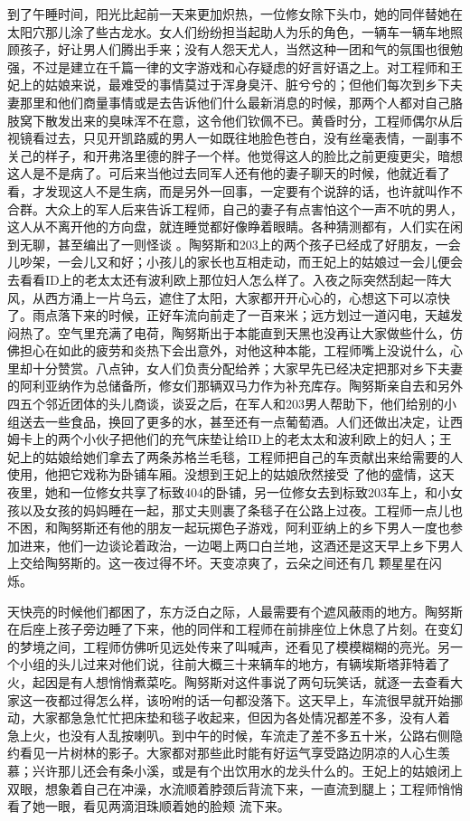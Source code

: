 \documentclass{article}
\begin{document}
\newpage

到了午睡时间，阳光比起前一天来更加炽热，一位修女除下头巾，她的同伴替她在太阳穴那儿涂了些古龙水。女人们纷纷担当起助人为乐的角色，一辆车一辆车地照顾孩子，好让男人们腾出手来；没有人怨天尤人，当然这种一团和气的氛围也很勉强，不过是建立在千篇一律的文字游戏和心存疑虑的好言好语之上。对工程师和王妃上的姑娘来说，最难受的事情莫过于浑身臭汗、脏兮兮的；但他们每次到乡下夫妻那里和他们商量事情或是去告诉他们什么最新消息的时候，那两个人都对自己胳肢窝下散发出来的臭味浑不在意，这令他们钦佩不已。黄昏时分，工程师偶尔从后视镜看过去，只见开凯路威的男人一如既往地脸色苍白，没有丝毫表情，一副事不关己的样子，和开弗洛里德的胖子一个样。他觉得这人的脸比之前更瘦更尖，暗想这人是不是病了。可后来当他过去同军人还有他的妻子聊天的时候，他就近看了看，才发现这人不是生病，而是另外一回事，一定要有个说辞的话，也许就叫作不合群。大众上的军人后来告诉工程师，自己的妻子有点害怕这个一声不吭的男人，这人从不离开他的方向盘，就连睡觉都好像睁着眼睛。各种猜测都有，人们实在闲到无聊，甚至编出了一则怪谈
\newpage
。陶努斯和203上的两个孩子已经成了好朋友，一会儿吵架，一会儿又和好；小孩儿的家长也互相走动，而王妃上的姑娘过一会儿便会去看看ID上的老太太还有波利欧上那位妇人怎么样了。入夜之际突然刮起一阵大风，从西方涌上一片乌云，遮住了太阳，大家都开开心心的，心想这下可以凉快了。雨点落下来的时候，正好车流向前走了一百来米；远方划过一道闪电，天越发闷热了。空气里充满了电荷，陶努斯出于本能直到天黑也没再让大家做些什么，仿佛担心在如此的疲劳和炎热下会出意外，对他这种本能，工程师嘴上没说什么，心里却十分赞赏。八点钟，女人们负责分配给养；大家早先已经决定把那对乡下夫妻的阿利亚纳作为总储备所，修女们那辆双马力作为补充库存。陶努斯亲自去和另外四五个邻近团体的头儿商谈，谈妥之后，在军人和203男人帮助下，他们给别的小组送去一些食品，换回了更多的水，甚至还有一点葡萄酒。人们还做出决定，让西姆卡上的两个小伙子把他们的充气床垫让给ID上的老太太和波利欧上的妇人；王妃上的姑娘给她们拿去了两条苏格兰毛毯，工程师把自己的车贡献出来给需要的人使用，他把它戏称为卧铺车厢。没想到王妃上的姑娘欣然接受
\newpage
了他的盛情，这天夜里，她和一位修女共享了标致404的卧铺，另一位修女去到标致203车上，和小女孩以及女孩的妈妈睡在一起，那丈夫则裹了条毯子在公路上过夜。工程师一点儿也不困，和陶努斯还有他的朋友一起玩掷色子游戏，阿利亚纳上的乡下男人一度也参加进来，他们一边谈论着政治，一边喝上两口白兰地，这酒还是这天早上乡下男人上交给陶努斯的。这一夜过得不坏。天变凉爽了，云朵之间还有几
颗星星在闪烁。 

天快亮的时候他们都困了，东方泛白之际，人最需要有个遮风蔽雨的地方。陶努斯在后座上孩子旁边睡了下来，他的同伴和工程师在前排座位上休息了片刻。在变幻的梦境之间，工程师仿佛听见远处传来了叫喊声，还看见了模模糊糊的亮光。另一个小组的头儿过来对他们说，往前大概三十来辆车的地方，有辆埃斯塔菲特着了火，起因是有人想悄悄煮菜吃。陶努斯对这件事说了两句玩笑话，就逐一去查看大家这一夜都过得怎么样，该吩咐的话一句都没落下。这天早上，车流很早就开始挪动，大家都急急忙忙把床垫和毯子收起来，但因为各处情况都差不多，没有人着
\newpage
急上火，也没有人乱按喇叭。到中午的时候，车流走了差不多五十米，公路右侧隐约看见一片树林的影子。大家都对那些此时能有好运气享受路边阴凉的人心生羡慕；兴许那儿还会有条小溪，或是有个出饮用水的龙头什么的。王妃上的姑娘闭上双眼，想象着自己在冲澡，水流顺着脖颈后背流下来，一直流到腿上；工程师悄悄看了她一眼，看见两滴泪珠顺着她的脸颊
流下来。 
\end{document}
